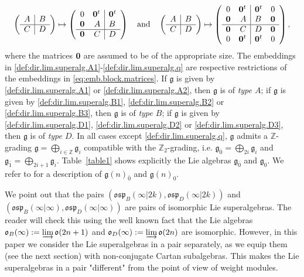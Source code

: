 \documentclass[12pt]{amsart}
\newcommand\Z{\mathbb{Z}}
\newcommand\g{\mathfrak{g}}
\newcommand\fosp{\mathfrak{osp}}
\newcommand\fo{\mathfrak{o}}
\theoremstyle{plain}
\theoremstyle{definition}
\numberwithin{equation}{section}
\begin{document}
\begin{equation}\label{eq:emb.block.matrices}
\left(\begin{array}{c|c}
    A & B  \\
\hline
    C & D
  \end{array}\right) \mapsto
\left(\begin{array}{cr|l}
	0 & {\bf 0}^t & {\bf 0}^t \\
    {\bf 0} & A & B  \\
\hline
    {\bf 0} &  C & D
  \end{array}\right)\quad\text{and}\quad \left(\begin{array}{c|c}
    A & B  \\
\hline
    C & D
  \end{array}\right) \mapsto
\left(\begin{array}{cr|lc}
	0 & {\bf 0}^t & {\bf 0}^t &0 \\
    {\bf 0} & A & B & {\bf 0} \\
\hline
    {\bf 0} &  C & D & {\bf 0}\\
    0 & {\bf 0}^t & {\bf 0}^t & 0
  \end{array}\right),
\end{equation}
where the matrices ${\bf 0}$ are assumed to be of the appropriate size. The embeddings in \eqref{def:dir.lim.superalg.A1}-\eqref{def:dir.lim.superalg.q} are respective restrictions of the embeddings in  \eqref{eq:emb.block.matrices}.  If $\g$ is given by \eqref{def:dir.lim.superalg.A1} or \eqref{def:dir.lim.superalg.A2}, then $\g$ is of \emph{type $A$}; if $\g$ is given by \eqref{def:dir.lim.superalg.B1}, \eqref{def:dir.lim.superalg.B2} or \eqref{def:dir.lim.superalg.B3}, then $\g$ is of \emph{type $B$}; if $\g$ is given by  \eqref{def:dir.lim.superalg.D1}, \eqref{def:dir.lim.superalg.D2} or \eqref{def:dir.lim.superalg.D3}, then $\g$ is of \emph{type $D$}. In all cases except \eqref{def:dir.lim.superalg.q}, $\g$ admits a $\Z$-grading $\g = \bigoplus_{i\in \Z}\g_i$ compatible with the $\Z_2$-grading, i.e. $\g_{\bar 0} = \bigoplus_{2i}\g_i$ and $\g_{\bar 1} = \bigoplus_{2i+1}\g_i$. Table~\ref{table1} shows explicitly the Lie algebras $\g_{\bar 0}$ and $\g_0$. We refer to \cite[Tables on Lie superalgebras]{FSS00} for a description of $\g(n)_{\bar 0}$ and $\g(n)_0$.

We point out that the pairs $(\fosp_B(\infty|2k), \fosp_D(\infty|2k))$ and $(\fosp_B(\infty|\infty), \fosp_D(\infty|\infty))$ are pairs of isomorphic Lie superalgebras. The reader will check this using the well known fact that the Lie algebras $\fo_B(\infty) := \varinjlim \fo(2n+1)$ and $\fo_D(\infty) := \varinjlim \fo(2n)$ are isomorphic. However, in this paper we consider the Lie superalgebras in a pair separately, as we equip them (see the next section) with non-conjugate Cartan subalgebras. This makes the Lie superalgebras in a pair "different" from the point of view of weight modules.
\end{document}
